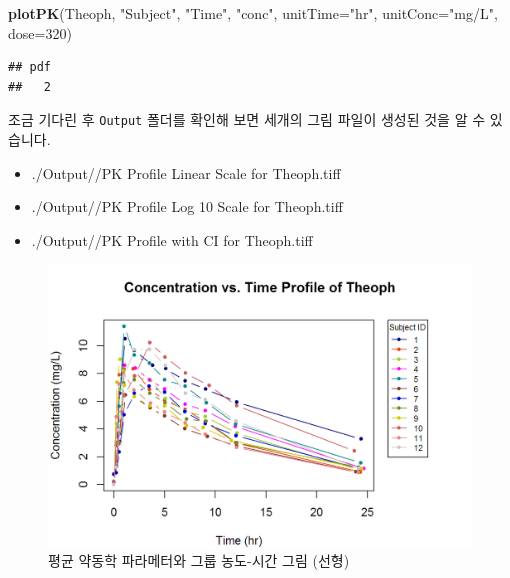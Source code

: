 \documentclass[12pt,]{krantz}
\newenvironment{Shaded}{\begin{snugshade}}{\end{snugshade}}
\newcommand{\KeywordTok}[1]{\textcolor[rgb]{0.13,0.29,0.53}{\textbf{#1}}}
\newcommand{\DataTypeTok}[1]{\textcolor[rgb]{0.13,0.29,0.53}{#1}}
\newcommand{\DecValTok}[1]{\textcolor[rgb]{0.00,0.00,0.81}{#1}}
\newcommand{\StringTok}[1]{\textcolor[rgb]{0.31,0.60,0.02}{#1}}
\newcommand{\NormalTok}[1]{#1}
\providecommand{\tightlist}{%
  \setlength{\itemsep}{0pt}\setlength{\parskip}{0pt}}
\theoremstyle{definition}
\theoremstyle{definition}
\theoremstyle{definition}
\theoremstyle{remark}
\begin{document}
\begin{Shaded}
\begin{Highlighting}[]
\KeywordTok{plotPK}\NormalTok{(Theoph, }\StringTok{"Subject"}\NormalTok{, }\StringTok{"Time"}\NormalTok{, }\StringTok{"conc"}\NormalTok{, }\DataTypeTok{unitTime=}\StringTok{"hr"}\NormalTok{, }\DataTypeTok{unitConc=}\StringTok{"mg/L"}\NormalTok{, }\DataTypeTok{dose=}\DecValTok{320}\NormalTok{)}
\end{Highlighting}
\end{Shaded}

\begin{verbatim}
## pdf 
##   2
\end{verbatim}

조금 기다린 후 \texttt{Output} 폴더를 확인해 보면 세개의 그림 파일이
생성된 것을 알 수 있습니다.

\begin{itemize}
\tightlist
\item
  ./Output//PK Profile Linear Scale for Theoph.tiff
\item
  ./Output//PK Profile Log 10 Scale for Theoph.tiff
\item
  ./Output//PK Profile with CI for Theoph.tiff
\end{itemize}

\begin{figure}
\includegraphics[width=16.67in]{Output/PK_Profile_Linear_Scale_for_Theoph} \caption{평균 약동학 파라메터와 그룹 농도-시간 그림 (선형)}\label{fig:unnamed-chunk-25}
\end{figure}
\end{document}
